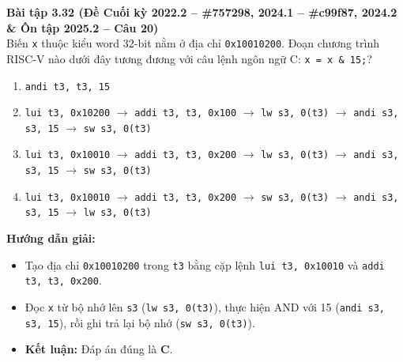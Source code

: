 \textbf{Bài tập 3.32 (Đề Cuối kỳ 2022.2 -- \#757298, 2024.1 -- \#c99f87, 2024.2 \& Ôn tập 2025.2 -- Câu 20)}\\
Biến \texttt{x} thuộc kiểu word 32-bit nằm ở địa chỉ \texttt{0x10010200}. Đoạn chương trình RISC-V nào dưới đây tương đương với câu lệnh ngôn ngữ C: \texttt{x = x \& 15;}?
\begin{enumerate}[label=\Alph*.]
    \item \texttt{andi t3, t3, 15}
    \item \texttt{lui t3, 0x10200} $\rightarrow$ \texttt{addi t3, t3, 0x100} $\rightarrow$ \texttt{lw s3, 0(t3)} $\rightarrow$ \texttt{andi s3, s3, 15} $\rightarrow$ \texttt{sw s3, 0(t3)}
    \item \texttt{lui t3, 0x10010} $\rightarrow$ \texttt{addi t3, t3, 0x200} $\rightarrow$ \texttt{lw s3, 0(t3)} $\rightarrow$ \texttt{andi s3, s3, 15} $\rightarrow$ \texttt{sw s3, 0(t3)}
    \item \texttt{lui t3, 0x10010} $\rightarrow$ \texttt{addi t3, t3, 0x200} $\rightarrow$ \texttt{sw s3, 0(t3)} $\rightarrow$ \texttt{andi s3, s3, 15} $\rightarrow$ \texttt{lw s3, 0(t3)}
\end{enumerate}
\textbf{Hướng dẫn giải:}
\begin{itemize}
    \item Tạo địa chỉ \texttt{0x10010200} trong \texttt{t3} bằng cặp lệnh \texttt{lui t3, 0x10010} và \texttt{addi t3, t3, 0x200}.
    \item Đọc \texttt{x} từ bộ nhớ lên \texttt{s3} (\texttt{lw s3, 0(t3)}), thực hiện AND với 15 (\texttt{andi s3, s3, 15}), rồi ghi trả lại bộ nhớ (\texttt{sw s3, 0(t3)}).
    \item \textbf{Kết luận:} Đáp án đúng là \textbf{C}.
\end{itemize}

